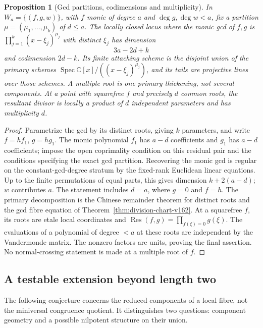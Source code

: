 \documentclass[11pt,reqno]{amsart}
\numberwithin{equation}{section}
\newtheorem{proposition}[theorem]{Proposition}
\theoremstyle{definition}\newtheorem{definition}[theorem]{Definition}
\theoremstyle{remark}\newtheorem{remark}[theorem]{Remark}
\newcommand{\C}{\mathbb C}\newcommand{\Q}{\mathbb Q}
\DeclareMathOperator{\Spec}{Spec}\DeclareMathOperator{\PGL}{PGL}
\begin{document}
\begin{proposition}[Gcd partitions, codimensions and multiplicity]
\label{prop:resultant-strata-v163}
In $W_a=\{(f,g,w)\}$, with $f$ monic of degree $a$ and
$\deg g,\deg w<a$, fix a partition
$\mu=(\mu_1,\ldots,\mu_k)$ of $d\leq a$. The locally closed locus
where the monic gcd of $f,g$ is
$\prod_{j=1}^k(x-\xi_j)^{\mu_j}$ with distinct $\xi_j$ has dimension
\[
                         3a-2d+k
\]
and codimension $2d-k$. Its finite attaching scheme is the disjoint
union of the primary schemes
$\Spec\C[x]/((x-\xi_j)^{\mu_j})$, and its tails are projective
lines over those schemes. A multiple root is one primary thickening,
not several components. At a point with squarefree $f$ and precisely
$d$ common roots, the resultant divisor is locally a product of
$d$ independent parameters and has multiplicity $d$.
\end{proposition}
\begin{proof}
Parametrize the gcd by its distinct roots, giving $k$ parameters,
and write $f=hf_1$, $g=hg_1$. The monic polynomial $f_1$ has
$a-d$ coefficients and $g_1$ has $a-d$ coefficients; impose the
open coprimality condition on this residual pair and the conditions
specifying the exact gcd partition. Recovering the monic gcd is
regular on the constant-gcd-degree stratum by the fixed-rank
Euclidean linear equations. Up to the finite permutations of equal
parts, this gives dimension $k+2(a-d)$; $w$ contributes $a$.
The statement includes $d=a$, where $g=0$ and $f=h$.
The primary decomposition is the Chinese remainder theorem for
distinct roots and the gcd fibre equation of
Theorem~\ref{thm:division-chart-v162}. At a squarefree $f$, its
roots are etale local coordinates and
$\operatorname{Res}(f,g)=\prod_{f(\xi)=0}g(\xi)$.
The evaluations of a polynomial of degree $<a$ at these roots are
independent by the Vandermonde matrix. The nonzero factors are
units, proving the final assertion. No normal-crossing statement
is made at a multiple root of $f$.
\end{proof}

\subsection{A testable extension beyond length two}
The following conjecture concerns the reduced components of a local
fibre, not the miniversal congruence quotient. It distinguishes two
questions: component geometry and a possible nilpotent structure on
their union.
\end{document}
